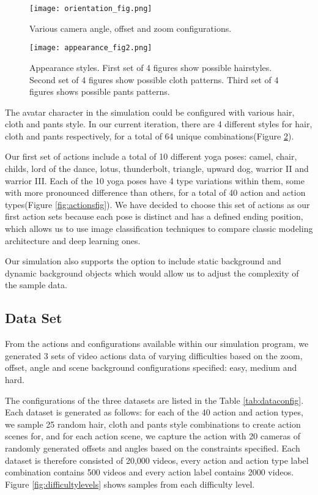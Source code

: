 \documentclass[
	a4paper, %
	10pt, %
	unnumberedsections, %
	twoside, %
]{t0004}
\begin{document}
\begin{figure}
	\texttt{[image: orientation\_fig.png]}
	\caption{Various camera angle, offset and zoom configurations.}
	\label{fig:orientationfig}
\end{figure}

\begin{figure}
	\texttt{[image: appearance\_fig2.png]}
	\caption{Appearance styles. First set of 4 figures show possible hairstyles. Second set of 4 figures show possible cloth patterns. Third set of 4 figures shows possible pants patterns.}
	\label{fig:appearancefig}
\end{figure}

The avatar character in the simulation could be configured with various hair, cloth and pants style. In our current iteration, there are 4 different styles for hair, cloth and pants respectively, for a total of 64 unique combinations(Figure \ref{fig:appearancefig}).

Our first set of actions include a total of 10 different yoga poses: camel, chair, childs, lord of the dance, lotus, thunderbolt, triangle, upward dog, warrior II and warrior III. Each of the 10 yoga poses have 4 type variations within them, some with more pronounced difference than others,  for a total of 40 action and action types(Figure \ref{fig:actionsfig}). We have decided to choose this set of actions as our first action sets because each pose is distinct and has a defined ending position, which allows us to use image classification techniques to compare classic modeling architecture and deep learning ones.

Our simulation also supports the option to include static background and dynamic background objects which would allow us to adjust the complexity of the sample data.

\subsection{Data Set} From the actions and configurations available within our simulation program, we generated 3 sets of video actions data of varying difficulties based on the zoom, offset, angle and scene background configurations specified: easy, medium and hard.

The configurations of the three datasets are listed in the Table \ref{tab:dataconfig}. Each dataset is generated as follows: for each of the 40 action and action types, we sample 25 random hair, cloth and pants style combinations to create action scenes for, and for each action scene, we capture the action with 20 cameras of randomly generated offsets and angles based on the constraints specified. Each dataset is therefore consisted of 20,000 videos, every action and action type label combination contains 500 videos and every action label contains 2000 videos. Figure \ref{fig:difficultylevels} shows samples from each difficulty level.
\end{document}
